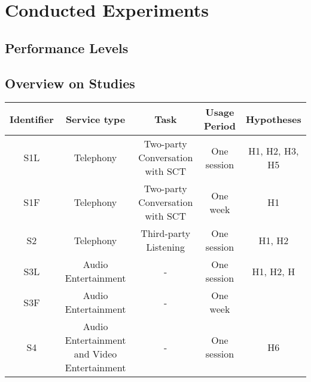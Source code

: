 \chapter{Conducted Experiments}
\section{Performance Levels}


\section{Overview on Studies}

\begin{table}[h]
	\begin{tabular}{|c|c|c|c|c|}
	Identifier	& Service type 			& Task 									& Usage Period	& Hypotheses \\
	\hline
	S1L			& Telephony				& Two-party Conversation with \ac{SCT}	& One session	& H1, H2, H3, H5 \\
	S1F			& Telephony				& Two-party Conversation with \ac{SCT}	& One week		& H1 \\
	S2			& Telephony				& Third-party Listening					& One session	& H1, H2 \\ 
	S3L			& Audio Entertainment	& -										& One session	& H1, H2, H\\
	S3F			& Audio Entertainment	& -										& One week		& \\
	S4			& Audio Entertainment and Video Entertainment & - 				& One session	& H6 \\
	
	
	\end{tabular}
\end{table}
